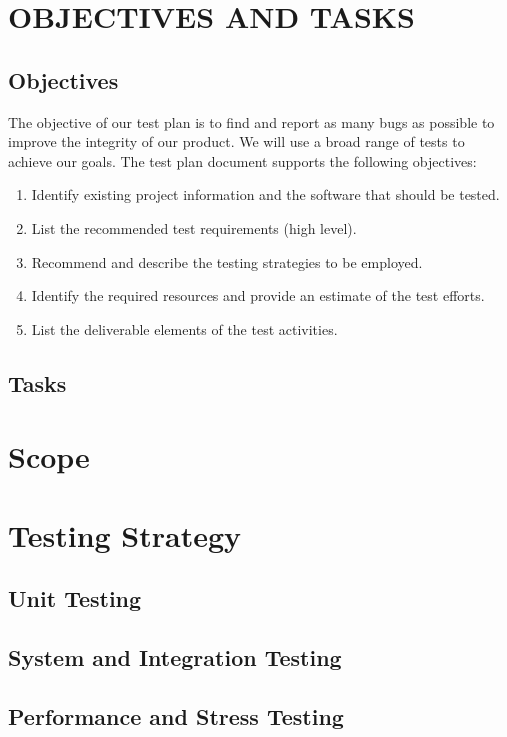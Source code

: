 \documentclass{article}
\begin{document}
\newpage

\section{OBJECTIVES AND TASKS}

\subsection{Objectives}
The objective of our test plan is to find and report as many bugs as possible to improve the integrity of our product. We will use a broad range of tests to achieve our goals. The test plan document supports the following objectives:
\begin{enumerate}
    \item Identify existing project information and the software that            should be tested.
    \item List the recommended test requirements (high level).
    \item Recommend and describe the testing strategies to be employed.
    \item Identify the required resources and provide an estimate of the         test efforts.
    \item List the deliverable elements of the test activities.
\end{enumerate}
\subsection{Tasks}


\newpage

\section{Scope}

\newpage

\section{Testing Strategy}
\subsection{Unit Testing}
\subsection{System and Integration Testing}
\subsection{Performance and Stress Testing}
\end{document}
